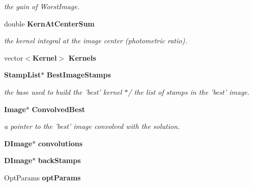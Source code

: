 \begin{CompactItemize}
\begin{CompactList}\small\item\em the gain of Worst\-Image.\item\end{CompactList}\item 
{}
double {\bf Kern\-At\-Center\-Sum}\label{class_kernelfit_m6}

\begin{CompactList}\small\item\em the kernel integral at the image center (photometric ratio).\item\end{CompactList}\item 
{}
vector$<${\bf Kernel}$>$ {\bf Kernels}\label{class_kernelfit_m7}

\item 
{\bf Stamp\-List}$\ast$ {\bf Best\-Image\-Stamps}
\begin{CompactList}\small\item\em the base used to build the 'best' kernel $\ast$/ the list of stamps in the 'best' image.\item\end{CompactList}\item 
{}
{\bf Image}$\ast$ {\bf Convolved\-Best}\label{class_kernelfit_m9}

\begin{CompactList}\small\item\em a pointer to the 'best' image convolved with the solution.\item\end{CompactList}\item 
{}
{\bf DImage}$\ast$ {\bf convolutions}\label{class_kernelfit_m10}

\item 
{}
{\bf DImage}$\ast$ {\bf back\-Stamps}\label{class_kernelfit_m11}

\item 
{}
Opt\-Params {\bf opt\-Params}\label{class_kernelfit_m12}


\end{CompactItemize}
